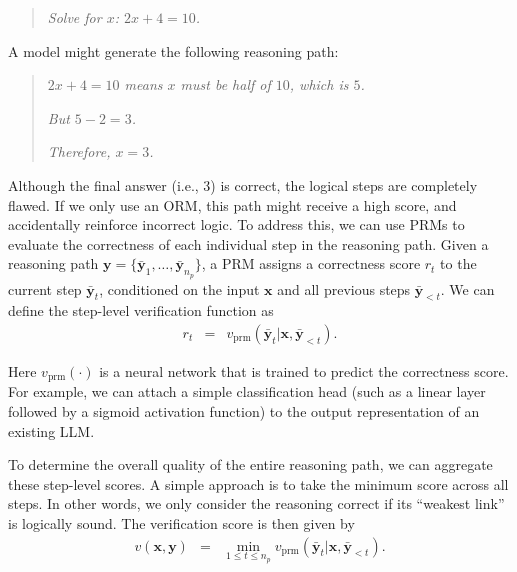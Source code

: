 \vspace{0.5em}
\begin{quote}
\textit{Solve for $x$: $2x + 4 = 10$.}
\end{quote}

\vspace{0.5em}
A model might generate the following reasoning path:
\vspace{0.5em}

\begin{quote}
\textit{$2x + 4 = 10$ means $x$ must be half of $10$, which is $5$.}

\textit{But $5 - 2 = 3$.}

\textit{Therefore, $x = 3$.}
\end{quote}
\vspace{0.5em}

Although the final answer (i.e., $3$) is correct, the logical steps are completely flawed. If we only use an ORM, this path might receive a high score, and accidentally reinforce incorrect logic. To address this, we can use PRMs to evaluate the correctness of each individual step in the reasoning path. Given a reasoning path $\mathbf{y} = \{\bar{\mathbf{y}}_1, \dots, \bar{\mathbf{y}}_{n_p}\}$, a PRM assigns a correctness score $r_t$ to the current step $\bar{\mathbf{y}}_t$, conditioned on the input $\mathbf{x}$ and all previous steps $\bar{\mathbf{y}}_{<t}$. We can define the step-level verification function as
\begin{eqnarray}
r_t & = & v_{\mathrm{prm}}(\bar{\mathbf{y}}_t | \mathbf{x}, \bar{\mathbf{y}}_{<t}).
\end{eqnarray}

\noindent Here $v_{\mathrm{prm}}(\cdot)$ is a neural network that is trained to predict the correctness score. For example, we can attach a simple classification head (such as a linear layer followed by a sigmoid activation function) to the output representation of an existing LLM.

To determine the overall quality of the entire reasoning path, we can aggregate these step-level scores. A simple approach is to take the minimum score across all steps. In other words, we only consider the reasoning correct if its ``weakest link'' is logically sound. The verification score is then given by
\begin{eqnarray}
v(\mathbf{x}, \mathbf{y}) & = & \min_{1 \le t \le n_p} v_{\mathrm{prm}}(\bar{\mathbf{y}}_t | \mathbf{x}, \bar{\mathbf{y}}_{<t}).
\end{eqnarray}


